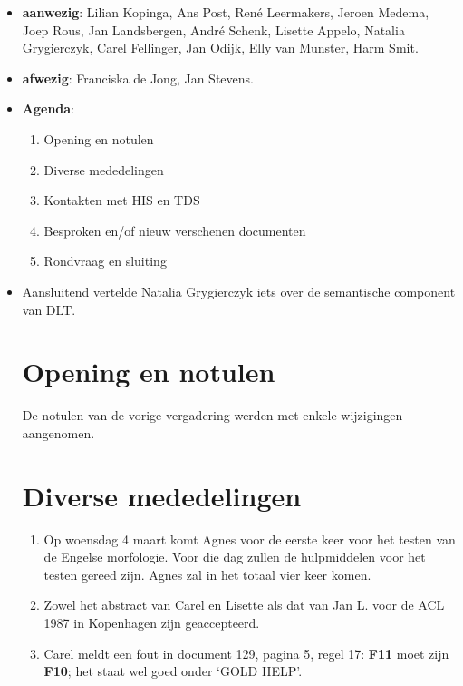 
   \RosDate{\today}
   \RosSupersedes{-}
   \MakeRosTitle
\begin{itemize}
  \item {\bf aanwezig}: Lilian Kopinga, Ans Post, Ren\'{e} Leermakers, 
             Jeroen Medema, Joep Rous, Jan Landsbergen, Andr\'{e} Schenk, 
             Lisette Appelo, Natalia Grygierczyk, Carel Fellinger, Jan Odijk, 
             Elly van Munster, Harm Smit.
  \item {\bf afwezig}: Franciska de Jong, Jan Stevens.
  \item {\bf Agenda}:
    \begin{enumerate}
       \item Opening en notulen
       \item Diverse mededelingen
       \item Kontakten met HIS en TDS
       \item Besproken en/of nieuw verschenen documenten
       \item Rondvraag en sluiting
    \end{enumerate}
  \item Aansluitend vertelde Natalia Grygierczyk iets over de semantische 
        component van DLT.
\section {Opening en notulen}
De notulen van de vorige vergadering werden met enkele wijzigingen aangenomen.
\section {Diverse mededelingen}
\begin{enumerate}
  \item Op woensdag 4 maart komt Agnes voor de eerste keer voor het testen van 
        de Engelse morfologie. Voor die dag zullen de hulpmiddelen voor het 
        testen gereed zijn. Agnes zal in het totaal vier keer komen.
  \item Zowel het abstract van Carel en Lisette als dat van Jan L. voor de ACL 
        1987 in Kopenhagen zijn geaccepteerd.
  \item Carel meldt een fout in document 129, pagina 5, regel 17: {\bf F11}
        moet zijn {\bf F10}; het staat wel goed onder `GOLD HELP'.
\end{enumerate}

\end{itemize}
